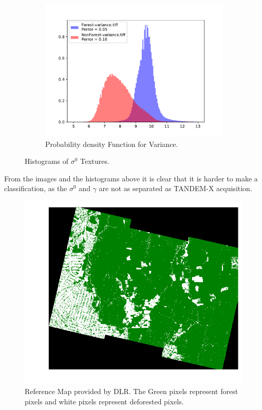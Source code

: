 \begin{figure}[H]
    \centering
    \begin{subfigure}[b]{0.4\linewidth}
        \includegraphics[width=\linewidth]{Chapter5/SENTINEL1/Sigma0/variance_histogram.pdf}
        \caption{Probability density Function for Variance.}
        \end{subfigure}
    \caption{Histograms of $\sigma^0$ Textures.}
    \label{fig: sentinel_sigma_hist}
\end{figure}

From the images and the histograms above it is clear that it is harder to make a classification, as the $\sigma^0$ and $\gamma$ are not as separated as TANDEM-X acquisition.
\begin{figure}[H]
    \centering
    \includegraphics[width=\linewidth]{Chapter5/TANDEM-X/reference_mapimage.pdf}
    \caption{Reference Map provided by DLR. The Green pixels represent forest pixels and white pixels represent deforested pixels.}
    \label{fig:ref_sentinel}
\end{figure}{}

